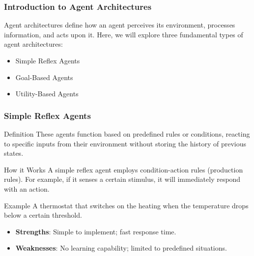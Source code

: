 \documentclass[aspectratio=169]{beamer}
\begin{document}
\begin{frame}[fragile]
    \frametitle{Introduction to Agent Architectures}
    Agent architectures define how an agent perceives its environment, processes information, and acts upon it. Here, we will explore three fundamental types of agent architectures:
    \begin{itemize}
        \item Simple Reflex Agents
        \item Goal-Based Agents
        \item Utility-Based Agents
    \end{itemize}
\end{frame}

\begin{frame}[fragile]
    \frametitle{Simple Reflex Agents}
    \begin{block}{Definition}
        These agents function based on predefined rules or conditions, reacting to specific inputs from their environment without storing the history of previous states.
    \end{block}
    \begin{block}{How it Works}
        A simple reflex agent employs condition-action rules (production rules). For example, if it senses a certain stimulus, it will immediately respond with an action.
    \end{block}
    \begin{block}{Example}
        A thermostat that switches on the heating when the temperature drops below a certain threshold.
    \end{block}
    \begin{itemize}
        \item \textbf{Strengths}: Simple to implement; fast response time.
        \item \textbf{Weaknesses}: No learning capability; limited to predefined situations.
    \end{itemize}
\end{frame}
\end{document}

